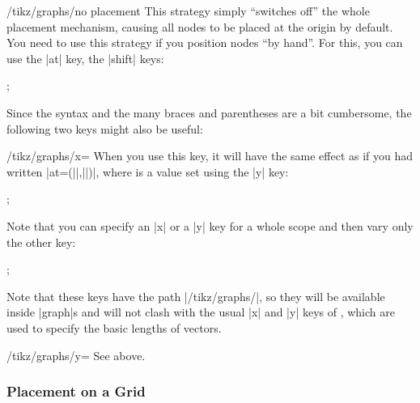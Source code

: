 \begin{key}{/tikz/graphs/no placement}
    This strategy simply ``switches off'' the whole placement mechanism,
    causing all nodes to be placed at the origin by default. You need to use
    this strategy if you position nodes ``by hand''. For this, you can use the
    |at| key, the |shift| keys:
\begin{codeexample}[preamble={\usetikzlibrary{graphs}}]
\tikz {};
\end{codeexample}
    Since the syntax and the many braces and parentheses are a bit cumbersome,
    the following two keys might also be useful:
    \begin{key}{/tikz/graphs/x=}
        When you use this key, it will have the same effect as if you had
        written |at={(||,||)}|, where
         is a value set using the |y| key:
\begin{codeexample}[preamble={\usetikzlibrary{graphs}}]
\tikz {};
\end{codeexample}
        Note that you can specify an |x| or a |y| key for a whole scope and
        then vary only the other key:
\begin{codeexample}[preamble={\usetikzlibrary{graphs}}]
\tikz {};
\end{codeexample}
        Note that these keys have the path |/tikz/graphs/|, so they will be
        available inside |graph|s and will not clash with the usual |x| and |y|
        keys of \tikzname, which are used to specify the basic lengths of
        vectors.
    \end{key}
    \begin{key}{/tikz/graphs/y=}
        See above.
    \end{key}
\end{key}


\subsubsection{Placement on a Grid}

